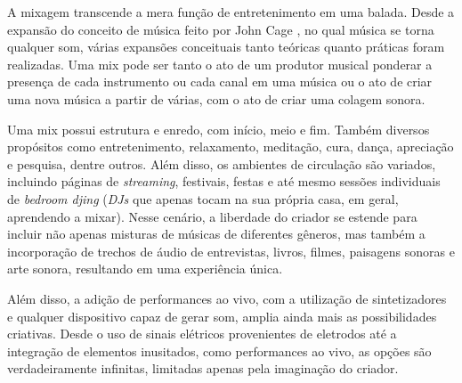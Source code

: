 A mixagem transcende a mera função de entretenimento em uma balada. Desde a expansão do conceito de música feito por John Cage \cite{cage}, no qual música se torna qualquer som, várias expansões conceituais tanto teóricas quanto práticas foram realizadas. Uma mix pode ser tanto o ato de um produtor musical ponderar a presença de cada instrumento ou cada canal em uma música ou o ato de criar uma nova música a partir de várias, com o ato de criar uma colagem sonora. 
\par
Uma mix possui estrutura e enredo, com início, meio e fim. Também diversos propósitos como entretenimento, relaxamento, meditação, cura, dança, apreciação e pesquisa, dentre outros. Além disso, os ambientes de circulação são variados, incluindo páginas de \textit{streaming}, festivais, festas e até mesmo sessões individuais de \textit{bedroom djing} (\textit{DJs} que apenas tocam na sua própria casa, em geral, aprendendo a mixar). Nesse cenário, a liberdade do criador se estende para incluir não apenas misturas de músicas de diferentes gêneros, mas também a incorporação de trechos de áudio de entrevistas, livros, filmes, paisagens sonoras e arte sonora, resultando em uma experiência única.
\par
Além disso, a adição de performances ao vivo, com a utilização de sintetizadores e qualquer dispositivo capaz de gerar som, amplia ainda mais as possibilidades criativas. Desde o uso de sinais elétricos provenientes de eletrodos até a integração de elementos inusitados, como performances ao vivo, as opções são verdadeiramente infinitas, limitadas apenas pela imaginação do criador.

